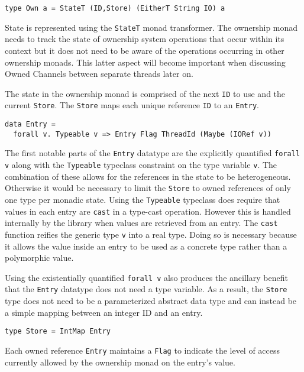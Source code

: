 \documentclass[onehalf,11pt]{beavtex}
\begin{document}
\begin{verbatim}
type Own a = StateT (ID,Store) (EitherT String IO) a
\end{verbatim}


State is represented using the \texttt{StateT} monad transformer.
The ownership monad needs to track the state of ownership system operations
that occur within its context but it does not need to be aware of the
operations occurring in other ownership monads.
This latter aspect will become important when discussing Owned Channels between
separate threads later on.

The state in the ownership monad is comprised of the next \texttt{ID}
to use and the current \texttt{Store}.  The \texttt{Store} maps each unique
reference \texttt{ID} to an \texttt{Entry}.

\begin{verbatim}
data Entry =
  forall v. Typeable v => Entry Flag ThreadId (Maybe (IORef v))
\end{verbatim}

The first notable parts of the \texttt{Entry} datatype are the explicitly
quantified \texttt{forall v} along with the \texttt{Typeable} typeclass
constraint on the type variable \texttt{v}.
The combination of these allows for the references in the state to be
heterogeneous.
Otherwise it would be necessary to limit the \texttt{Store} to owned
references of only one type per monadic state. %
Using the \texttt{Typeable} typeclass does require that values in each entry are
\texttt{cast} in a type-cast operation.  However this is handled internally
by the library when values are retrieved from an entry.
The \texttt{cast} function reifies the generic type \texttt{v} into a real
type.
Doing so is necessary because it allows the value inside an entry to be used
as a concrete type rather than a polymorphic value.

Using the existentially quantified \texttt{forall v} also produces the
ancillary benefit that the \texttt{Entry} datatype does not need a type
variable.
As a result, the \texttt{Store} type does not need to be a parameterized abstract
data type and can instead be a simple mapping between an integer ID and an entry.

\begin{verbatim}
type Store = IntMap Entry
\end{verbatim}

Each owned reference \texttt{Entry} maintains a \texttt{Flag} to indicate the
level of access currently allowed by the ownership monad on the entry's value.
\end{document}
